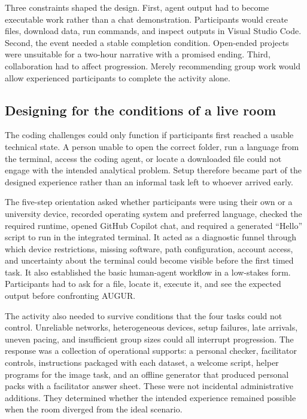 \documentclass[11pt,a4paper]{article}
\begin{document}
Three constraints shaped the design. First, agent output had to become executable work rather than a chat demonstration. Participants would create files, download data, run commands, and inspect outputs in Visual Studio Code. Second, the event needed a stable completion condition. Open-ended projects were unsuitable for a two-hour narrative with a promised ending. Third, collaboration had to affect progression. Merely recommending group work would allow experienced participants to complete the activity alone.

\subsection{Designing for the conditions of a live room}

The coding challenges could only function if participants first reached a usable technical state. A person unable to open the correct folder, run a language from the terminal, access the coding agent, or locate a downloaded file could not engage with the intended analytical problem. Setup therefore became part of the designed experience rather than an informal task left to whoever arrived early.

The five-step orientation asked whether participants were using their own or a university device, recorded operating system and preferred language, checked the required runtime, opened GitHub Copilot chat, and required a generated ``Hello'' script to run in the integrated terminal. It acted as a diagnostic funnel through which device restrictions, missing software, path configuration, account access, and uncertainty about the terminal could become visible before the first timed task. It also established the basic human-agent workflow in a low-stakes form. Participants had to ask for a file, locate it, execute it, and see the expected output before confronting AUGUR.

The activity also needed to survive conditions that the four tasks could not control. Unreliable networks, heterogeneous devices, setup failures, late arrivals, uneven pacing, and insufficient group sizes could all interrupt progression. The response was a collection of operational supports: a personal checker, facilitator controls, instructions packaged with each dataset, a welcome script, helper programs for the image task, and an offline generator that produced personal packs with a facilitator answer sheet. These were not incidental administrative additions. They determined whether the intended experience remained possible when the room diverged from the ideal scenario.
\end{document}
